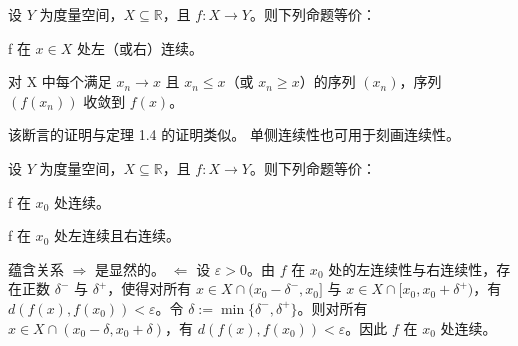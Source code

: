 \begin{proposition}

设 $ Y $ 为度量空间，$ X \subseteq \mathbb{R} $，且 $ f: X \to Y $。则下列命题等价：

\begin{subitems}
\item

f 在 $ x \in X $ 处左（或右）连续。

\item

对 X 中每个满足 $ x_n \to x $ 且 $ x_n \leq x $（或 $ x_n \geq x $）的序列 $ (x_n) $，序列 $ (f(x_n)) $ 收敛到 $ f(x) $。

\proofhead
该断言的证明与定理 1.4 的证明类似。
单侧连续性也可用于刻画连续性。
\end{subitems}

\end{proposition}

\begin{proposition}

设 $ Y $ 为度量空间，$ X \subseteq \mathbb{R} $，且 $ f: X \to Y $。则下列命题等价：

\begin{subitems}
\item

f 在 $ x_{0} $ 处连续。

\item

f 在 $ x_{0} $ 处左连续且右连续。

\proofhead
蕴含关系 $\Rightarrow$ 是显然的。
$\Leftarrow$ 设 $\varepsilon > 0$。由 $f$ 在 $x_0$ 处的左连续性与右连续性，存在正数 $\delta^-$ 与 $\delta^+$，使得对所有 $x \in X \cap (x_0 - \delta^-, x_0]$ 与 $x \in X \cap [x_0, x_0 + \delta^+)$，有 $d(f(x), f(x_0)) < \varepsilon$。令 $\delta := \min\{\delta^-, \delta^+\}$。则对所有 $x \in X \cap (x_0 - \delta, x_0 + \delta)$，有 $d(f(x), f(x_0)) < \varepsilon$。因此 $f$ 在 $x_0$ 处连续。
\end{subitems}

\end{proposition}

\exerciseshead

